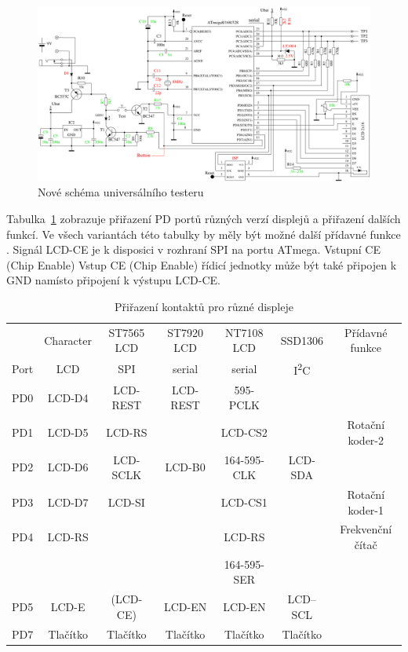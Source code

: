 \begin{figure}[H]
\centering
\includegraphics[width=18cm]{../FIG/ttester.pdf}
\caption{Nové schéma universálního testeru}
\label{fig:ttester}
\end{figure}

Tabulka~\ref{tab:displayCon} zobrazuje přiřazení PD portů různých verzí displejů
a přiřazení dalších funkcí.
Ve všech variantách této tabulky by měly být možné další přídavné funkce .
Signál LCD-CE je k disposici v rozhraní SPI na portu ATmega.  Vstupní CE (Chip Enable)
Vstup CE (Chip Enable) řídicí jednotky může být také připojen k GND namísto připojení k výstupu LCD-CE.

\begin{table}[H]
  \begin{center}
    \begin{tabular}{| c || c | c | c | c | c | c |}
    \hline
           & Character     & ST7565 LCD & ST7920 LCD     & NT7108 LCD  & SSD1306     & Přídavné funkce \\
      Port & LCD           &   SPI      & serial         & serial      &   I\textsuperscript{2}C      & \\
    \hline
    \hline
    PD0    &  LCD-D4       &  LCD-REST  & LCD-REST       & 595-PCLK        &            & \\
    \hline
    PD1    &  LCD-D5       &  LCD-RS    &                & LCD-CS2     &             & Rotační koder-2 \\
    \hline
    PD2    &  LCD-D6       &  LCD-SCLK  & LCD-B0         & 164-595-CLK &  LCD-SDA    & \\
    \hline
    PD3    &  LCD-D7       &  LCD-SI    &                & LCD-CS1     &             & Rotační koder-1 \\
    \hline
    PD4    &  LCD-RS       &            &                & LCD-RS      &             & Frekvenční čítač \\
           &               &            &                & 164-595-SER &             &                \\
    \hline
    PD5    &  LCD-E        &  (LCD-CE)  & LCD-EN         & LCD-EN      &   LCD--SCL  & \\
    \hline
    PD7    & Tlačítko & Tlačítko & Tlačítko & Tlačítko & Tlačítko & \\
    \hline
    \end{tabular}
  \end{center}
  \caption{Přiřazení kontaktů pro různé displeje}
  \label{tab:displayCon}
\end{table}

